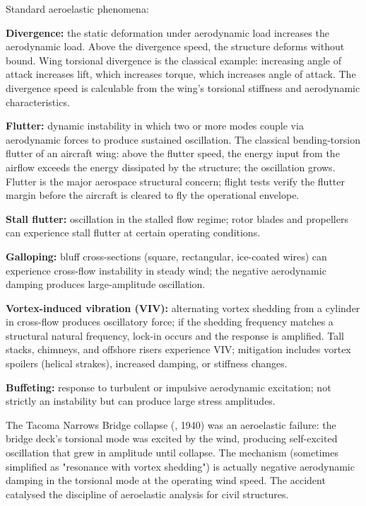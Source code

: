 Standard aeroelastic phenomena:

\textbf{Divergence:} the static deformation under aerodynamic load increases the aerodynamic load. Above the divergence speed, the structure deforms without bound. Wing torsional divergence is the classical example: increasing angle of attack increases lift, which increases torque, which increases angle of attack. The divergence speed is calculable from the wing's torsional stiffness and aerodynamic characteristics.

\textbf{Flutter:} dynamic instability in which two or more modes couple via aerodynamic forces to produce sustained oscillation. The classical bending-torsion flutter of an aircraft wing: above the flutter speed, the energy input from the airflow exceeds the energy dissipated by the structure; the oscillation grows. Flutter is the major aerospace structural concern; flight tests verify the flutter margin before the aircraft is cleared to fly the operational envelope.

\textbf{Stall flutter:} oscillation in the stalled flow regime; rotor blades and propellers can experience stall flutter at certain operating conditions.

\textbf{Galloping:} bluff cross-sections (square, rectangular, ice-coated wires) can experience cross-flow instability in steady wind; the negative aerodynamic damping produces large-amplitude oscillation.

\textbf{Vortex-induced vibration (VIV):} alternating vortex shedding from a cylinder in cross-flow produces oscillatory force; if the shedding frequency matches a structural natural frequency, lock-in occurs and the response is amplified. Tall stacks, chimneys, and offshore risers experience VIV; mitigation includes vortex spoilers (helical strakes), increased damping, or stiffness changes.

\textbf{Buffeting:} response to turbulent or impulsive aerodynamic excitation; not strictly an instability but can produce large stress amplitudes.

The Tacoma Narrows Bridge collapse (\cite{acc:tacoma-narrows-1941}, 1940) was an aeroelastic failure: the bridge deck's torsional mode was excited by the wind, producing self-excited oscillation that grew in amplitude until collapse. The mechanism (sometimes simplified as "resonance with vortex shedding") is actually negative aerodynamic damping in the torsional mode at the operating wind speed. The accident catalysed the discipline of aeroelastic analysis for civil structures.

